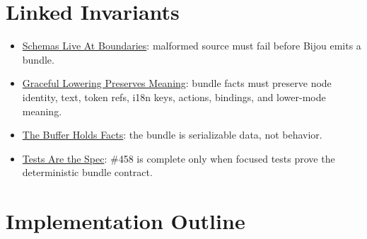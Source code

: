 \section{Linked Invariants}\label{record-145-linked-invariants}

\begin{itemize}
\tightlist
\item
  \href{https://github.com/flyingrobots/bijou/blob/cbd70612140e7a450d764b3c7be1c6af878b99bc/docs/invariants/schemas-live-at-boundaries.md}{Schemas Live At Boundaries}: malformed source must fail before Bijou emits a bundle.
\item
  \href{https://github.com/flyingrobots/bijou/blob/cbd70612140e7a450d764b3c7be1c6af878b99bc/docs/invariants/graceful-lowering-preserves-meaning.md}{Graceful Lowering Preserves Meaning}: bundle facts must preserve node identity, text, token refs, i18n keys, actions, bindings, and lower-mode meaning.
\item
  \href{https://github.com/flyingrobots/bijou/blob/cbd70612140e7a450d764b3c7be1c6af878b99bc/docs/invariants/buffer-holds-facts.md}{The Buffer Holds Facts}: the bundle is serializable data, not behavior.
\item
  \href{https://github.com/flyingrobots/bijou/blob/cbd70612140e7a450d764b3c7be1c6af878b99bc/docs/invariants/tests-are-the-spec.md}{Tests Are the Spec}: \#458 is complete only when focused tests prove the deterministic bundle contract.
\end{itemize}

\section{Implementation Outline}\label{record-145-implementation-outline}

